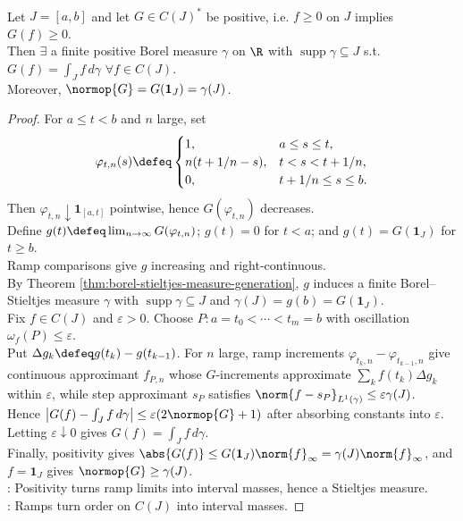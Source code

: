 \begin{theorem} \label{thm:positive-riesz-representation-c-interval} \\
Let $J=[a,b]$ and let $G\in C(J)^*$ be positive, i.e. $f\geq0$ on $J$ implies $G(f)\geq0$.\\
Then $\exists$ a finite positive Borel measure $\gamma$ on $\R$ with $\operatorname{supp}\gamma\subseteq J$ s.t. $G(f)=\int_J f\,d\gamma$ $\forall f\in C(J)$.\\
Moreover, $\normop{G}=G(\mathbf{1}_J)=\gamma(J)$.
\begin{proof}
For $a\leq t<b$ and $n$ large, set
\begin{align}
\varphi_{t,n}(s)\defeq
\begin{cases}
1, & a\leq s\leq t,\\
n(t+1/n-s), & t<s<t+1/n,\\
0, & t+1/n\leq s\leq b.
\end{cases} \nonumber
\end{align}
Then $\varphi_{t,n}\downarrow \mathbf{1}_{[a,t]}$ pointwise, hence $G(\varphi_{t,n})$ decreases.\\
Define $g(t)\defeq\lim_{n\to\infty}G(\varphi_{t,n})$; $g(t)=0$ for $t<a$; and $g(t)=G(\mathbf{1}_J)$ for $t \geq b$.\\
Ramp comparisons give $g$ increasing and right-continuous.\\
By Theorem \ref{thm:borel-stieltjes-measure-generation}, $g$ induces a finite Borel--Stieltjes measure $\gamma$ with $\operatorname{supp}\gamma\subseteq J$ and $\gamma(J)=g(b)=G(\mathbf{1}_J)$.\\
Fix $f\in C(J)$ and $\varepsilon>0$. Choose $P:a=t_0<\cdots<t_m=b$ with oscillation $\omega_f(P)\leq\varepsilon$.\\
Put $\Delta g_k\defeq g(t_k)-g(t_{k-1})$. For $n$ large, ramp increments $\varphi_{t_k,n}-\varphi_{t_{k-1},n}$ give continuous approximant $f_{P,n}$ whose $G$-increments approximate $\sum_k f(t_k)\Delta g_k$ within $\varepsilon$, while step approximant $s_P$ satisfies $\norm{f-s_P}_{L^1(\gamma)}\leq\varepsilon\gamma(J)$.\\
Hence $\left|G(f)-\int_Jf\,d\gamma\right|\leq \varepsilon(2\normop{G}+1)$ after absorbing constants into $\varepsilon$. Letting $\varepsilon\downarrow0$ gives $G(f)=\int_Jf\,d\gamma$.\\
Finally, positivity gives $\abs{G(f)}\leq G(\mathbf{1}_J)\norm{f}_\infty=\gamma(J)\norm{f}_\infty$, and $f=\mathbf{1}_J$ gives $\normop{G}\geq\gamma(J)$.\\
: Positivity turns ramp limits into interval masses, hence a Stieltjes measure.\\
: Ramps turn order on $C(J)$ into interval masses.
\end{proof}
\end{theorem}

